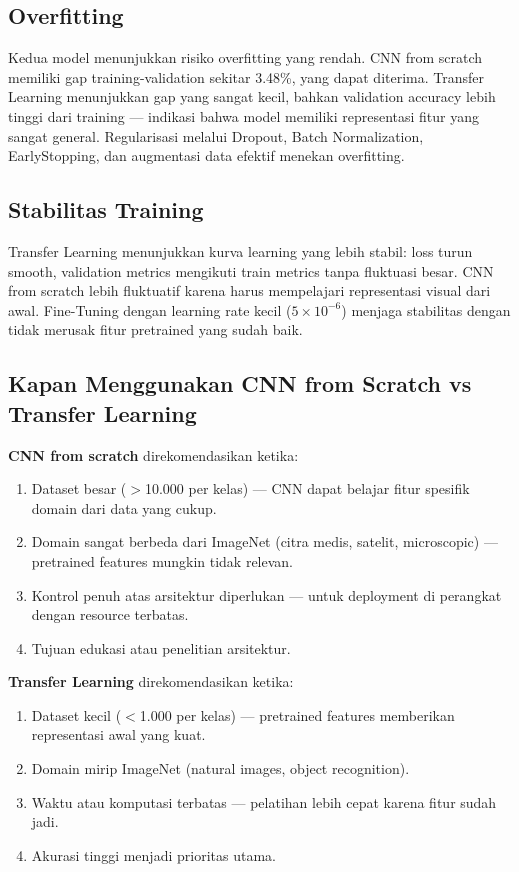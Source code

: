 \documentclass[conference]{IEEEtran}
\begin{document}
\subsection{Overfitting}
Kedua model menunjukkan risiko overfitting yang rendah. CNN from scratch memiliki gap training-validation sekitar 3.48\%, yang dapat diterima. Transfer Learning menunjukkan gap yang sangat kecil, bahkan validation accuracy lebih tinggi dari training — indikasi bahwa model memiliki representasi fitur yang sangat general. Regularisasi melalui Dropout, Batch Normalization, EarlyStopping, dan augmentasi data efektif menekan overfitting.

\subsection{Stabilitas Training}
Transfer Learning menunjukkan kurva learning yang lebih stabil: loss turun smooth, validation metrics mengikuti train metrics tanpa fluktuasi besar. CNN from scratch lebih fluktuatif karena harus mempelajari representasi visual dari awal. Fine-Tuning dengan learning rate kecil ($5\times10^{-6}$) menjaga stabilitas dengan tidak merusak fitur pretrained yang sudah baik.

\subsection{Kapan Menggunakan CNN from Scratch vs Transfer Learning}
\textbf{CNN from scratch} direkomendasikan ketika:
\begin{enumerate}
\item Dataset besar ($>$10.000 per kelas) — CNN dapat belajar fitur spesifik domain dari data yang cukup.
\item Domain sangat berbeda dari ImageNet (citra medis, satelit, microscopic) — pretrained features mungkin tidak relevan.
\item Kontrol penuh atas arsitektur diperlukan — untuk deployment di perangkat dengan resource terbatas.
\item Tujuan edukasi atau penelitian arsitektur.
\end{enumerate}

\textbf{Transfer Learning} direkomendasikan ketika:
\begin{enumerate}
\item Dataset kecil ($<$1.000 per kelas) — pretrained features memberikan representasi awal yang kuat.
\item Domain mirip ImageNet (natural images, object recognition).
\item Waktu atau komputasi terbatas — pelatihan lebih cepat karena fitur sudah jadi.
\item Akurasi tinggi menjadi prioritas utama.
\end{enumerate}
\end{document}
